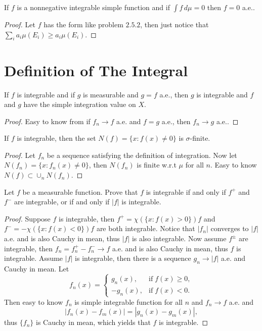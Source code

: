 \begin{pro}%
	If $f$ is a nonnegative integrable simple function and if $\int f\,d\mu=0$ then $f=0$ a.e..
\end{pro}
\begin{proof}
	Let $f$ has the form like problem $2.5.2$, then just notice that $\sum_i a_i\mu(E_i)\geq a_i\mu(E_i)$.
\end{proof}

\section{Definition of The Integral}
\begin{pro}%
	If $f$ is integrable and if $g$ is measurable and $g=f$ a.e., then $g$ is integrable and $f$ and $g$ have the simple integration value on $X$.
\end{pro}
\begin{proof}
	Easy to know from if $f_n\to f$ a.e. and $f=g$ a.e., then $f_n\to g$ a.e..
\end{proof}

\begin{pro}%
	If $f$ is integrable, then the set $N(f)=\{x\colon f(x)\neq 0\}$ is $\sigma$-finite.
\end{pro}
\begin{proof}
	Let $f_n$ be a sequence satisfying the definition of integration. Now let $N(f_n)=\{x\colon f_n(x)\neq 0\}$, then
	$N(f_n)$ is finite w.r.t $\mu$ for all $n$. Easy to know $N(f)\subset\cup_n N(f_n)$.
\end{proof}

\begin{pro}%
	Let $f$ be a measurable function. Prove that $f$ is integrable if and only if $f^+$ and $f^-$ are integrable, or if and only if $|f|$ is integrable.
\end{pro}
\begin{proof}
	Suppose $f$ is integrable, then $f^+=\chi(\{x\colon f(x)>0\})f$ and $f^-=-\chi(\{x\colon f(x)<0\})f$ are both integrable. Notice that $|f_n|$ converges to $|f|$ a.e. and is also Cauchy in mean, thus $|f|$ is also integrable. Now assume $f^{\pm}$ are integrable, then $f_n=f^+_n-f^-_n\to f$ a.e. and is also Cauchy in mean, thus $f$ is integrable. Assume $|f|$ is integrable, then there is a sequence $g_n\to |f|$ a.e. and Cauchy in mean. Let
	\[f_n(x)=\begin{cases}g_n(x),&\mbox{if}\;f(x)\geq 0,\\-g_n(x),&\mbox{if}\;f(x)<0.\end{cases}\]
	Then easy to know $f_n$ is simple integrable function for all $n$ and $f_n\to f$ a.e. and
	\[|f_n(x)-f_m(x)|=|g_n(x)-g_m(x)|,\]
	thus $\{f_n\}$ is Cauchy in mean, which yields that $f$ is integrable.
\end{proof}

